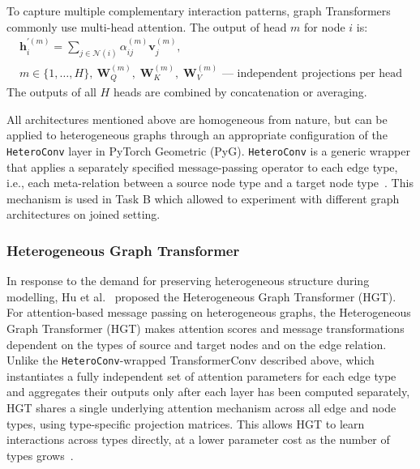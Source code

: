 To capture multiple complementary interaction patterns, graph Transformers
commonly use multi-head attention.
The output of head $m$ for node $i$ is:
\begin{equation}
\begin{gathered}
\mathbf{h}_i^{\prime(m)} =
\sum_{j \in \mathcal{N}(i)}
\alpha_{ij}^{(m)}\mathbf{v}_{j}^{(m)}, \\[0.4em]
{\scriptstyle
m\in\{1,\ldots,H\},\ 
\mathbf{W}_{Q}^{(m)},\;\mathbf{W}_{K}^{(m)},\;\mathbf{W}_{V}^{(m)}\text{ --- independent projections per head}
}
\end{gathered}
\end{equation}
The outputs of all $H$ heads are combined by concatenation or averaging.

All architectures mentioned above are homogeneous from nature, but can be applied to heterogeneous
graphs through an appropriate configuration of the \texttt{HeteroConv} layer in
PyTorch Geometric (PyG). \texttt{HeteroConv} is a generic wrapper that applies
a separately specified message-passing operator to each edge type, i.e., each
meta-relation between a source node type and a target node type~\cite{wojcik2026grafowe}.
This mechanism is used in Task B which allowed to experiment with different graph architectures 
on joined setting.


\subsubsection{Heterogeneous Graph Transformer}

In response to the demand for preserving heterogeneous structure during modelling, Hu et al.~\cite{hu2020hgt} 
proposed the Heterogeneous Graph Transformer (HGT).
For attention-based message passing on heterogeneous graphs, the
Heterogeneous Graph Transformer (HGT) makes attention scores and message
transformations dependent on the types of source and target nodes and on the
edge relation.
Unlike the \texttt{HeteroConv}-wrapped TransformerConv described above,
which instantiates a fully independent set of attention parameters for
each edge type and aggregates their outputs only after each layer has
been computed separately, HGT shares a single underlying attention
mechanism across all edge and node types, using type-specific projection
matrices. This allows HGT to learn
interactions across types directly, at a lower parameter cost as the
number of types grows~\cite{hu2020hgt}.

